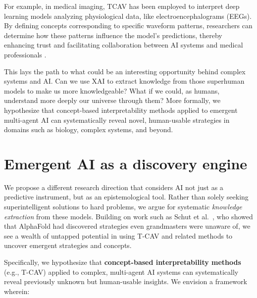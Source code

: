 \documentclass[11pt]{article}
\begin{document}
For example, in medical imaging, TCAV has been employed to interpret deep learning models analyzing physiological data, like electroencephalograms (EEGs). By defining concepts corresponding to specific waveform patterns, researchers can determine how these patterns influence the model's predictions, thereby enhancing trust and facilitating collaboration between AI systems and medical professionals \cite{tcav_eeg}.

This lays the path to what could be an interesting opportunity behind complex systems and AI. Can we use XAI to extract knowledge from those superhuman models to make us more knowledgeable? What if we could, as humans, understand more deeply our universe through them?
More formally, we hypothesize that concept-based interpretability methods applied to emergent multi-agent AI can systematically reveal novel, human-usable strategies in domains such as biology, complex systems, and beyond.

\section{Emergent AI as a discovery engine}
We propose a different research direction that considers AI not just as a predictive instrument, but as an epistemological tool. Rather than solely seeking superintelligent solutions to hard problems, we argue for systematic \emph{knowledge extraction} from these models. Building on work such as Schut et al.~\cite{schut}, who showed that AlphaFold had discovered strategies even grandmasters were unaware of, we see a wealth of untapped potential in using T-CAV and related methods to uncover emergent strategies and concepts.

Specifically, we hypothesize that \textbf{concept-based interpretability methods} (e.g., T-CAV) applied to complex, multi-agent AI systems can systematically reveal previously unknown but human-usable insights. We envision a framework wherein:
\end{document}
